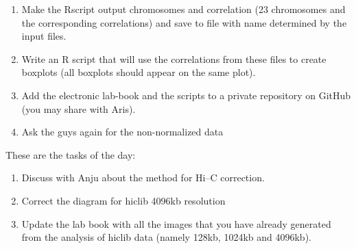 \documentclass[idxtotoc,hyperref,openany]{labbook} %
\newcommand{\HRule}{\rule{\linewidth}{0.5mm}} %
\begin{document}
\begin{enumerate}
  \item Make the Rscript output chromosomes and correlation
  (23 chromosomes and the corresponding correlations) and save
  to file with name determined by the input files.
  \item Write an R script that will use the correlations
  from these files to create boxplots (all boxplots should
  appear on the same plot).
  \item Add the electronic lab-book and the scripts to a private
  repository on GitHub (you may share with Aris).
  \item Ask the guys again for the non-normalized data
\end{enumerate}




These are the tasks of the day:

\begin{enumerate}
	\item Discuss with Anju about the method for Hi--C correction.
	\item Correct the diagram for hiclib 4096kb resolution
	\item Update the lab book with all the images that you have already generated from the analysis of hiclib data (namely 128kb, 1024kb and 4096kb).
\end{enumerate}
    







\end{document}
